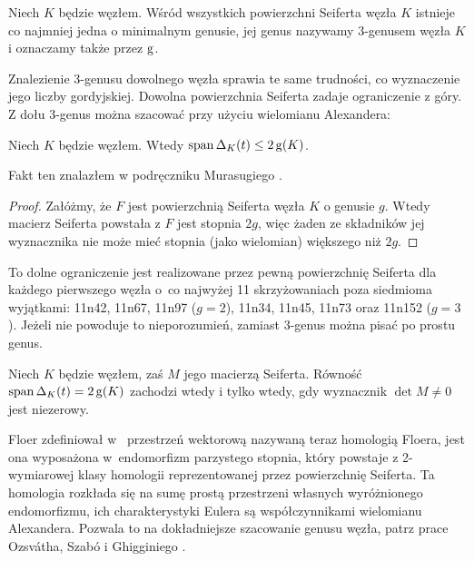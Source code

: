 \begin{definition}[3-genus]
    Niech $K$ będzie węzłem.
    Wśród wszystkich powierzchni Seiferta węzła $K$ istnieje co najmniej jedna o minimalnym genusie, jej genus nazywamy 3-genusem węzła $K$ i oznaczamy także przez $\operatorname{g}$.
\end{definition}

Znalezienie 3-genusu dowolnego węzła sprawia te same trudności, co wyznaczenie jego liczby gordyjskiej.
Dowolna powierzchnia Seiferta zadaje ograniczenie z góry.
Z dołu 3-genus można szacować przy użyciu wielomianu Alexandera:
%

\begin{proposition}
    \label{prp:alexander_genus}
    Niech $K$ będzie węzłem.
    Wtedy $\operatorname{span} \Delta_K(t) \le 2\operatorname{g}(K)$.
\end{proposition}

Fakt ten znalazłem w podręczniku Murasugiego \cite[s. 131]{murasugi96}.

\begin{proof}
    Załóżmy, że $F$ jest powierzchnią Seiferta węzła $K$ o genusie $g$.
    Wtedy macierz Seiferta powstała z $F$ jest stopnia $2g$, więc żaden ze składników jej wyznacznika nie może mieć stopnia (jako wielomian) większego niż $2g$.
\end{proof}

To dolne ograniczenie jest realizowane przez pewną powierzchnię Seiferta dla każdego pierwszego węzła o~co najwyżej 11 skrzyżowaniach poza siedmioma wyjątkami: 11n42, 11n67, 11n97 ($g = 2$), 11n34, 11n45, 11n73 oraz 11n152 ($g = 3$).
Jeżeli nie powoduje to nieporozumień, zamiast 3-genus można pisać po prostu genus.

\begin{proposition}
    Niech $K$ będzie węzłem, zaś $M$ jego macierzą Seiferta.
    Równość $\operatorname{span} \Delta_K(t) = 2\operatorname{g}(K)$ zachodzi wtedy i tylko wtedy, gdy wyznacznik $\det M \neq 0$ jest niezerowy.
\end{proposition}

Floer zdefiniował w~\cite{floer90} przestrzeń wektorową nazywaną teraz homologią Floera, jest ona wyposażona w~endomorfizm parzystego stopnia, który powstaje z 2-wymiarowej klasy homologii reprezentowanej przez powierzchnię Seiferta.
Ta homologia rozkłada się na sumę prostą przestrzeni własnych wyróżnionego endomorfizmu, ich charakterystyki Eulera są współczynnikami wielomianu Alexandera.
Pozwala to na dokładniejsze szacowanie genusu węzła, patrz prace Ozsvátha, Szabó \cite{szabo03} i Ghigginiego \cite{ghiggini08}.

